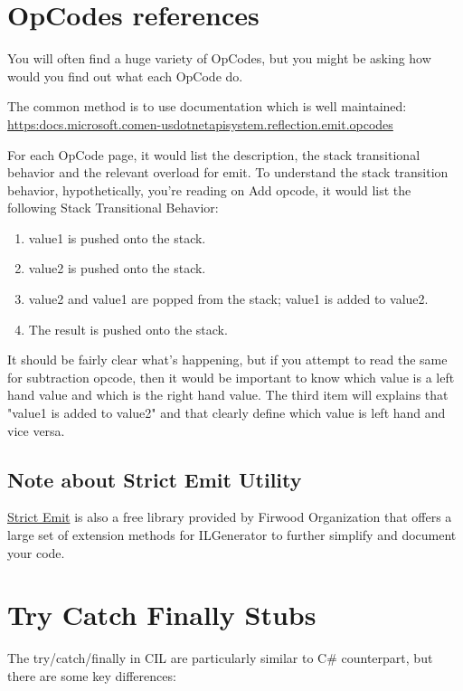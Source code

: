 \section{OpCodes references}
You will often find a huge variety of OpCodes, but you might be asking how would you find out what each OpCode do.

The common method is to use documentation which is well maintained: \href{https://docs.microsoft.com/en-us/dotnet/api/system.reflection.emit.opcodes}{https:\/\/docs.microsoft.com\/en-us\/dotnet\/api\/system.reflection.emit.opcodes}

 For each OpCode page, it would list the description, the stack transitional behavior and the relevant overload for emit. To understand the stack transition behavior, hypothetically, you're reading on Add opcode, it would list the following Stack Transitional Behavior:

\begin{enumerate}
\item value1 is pushed onto the stack. 
\item value2 is pushed onto the stack. 
\item value2 and value1 are popped from the stack; value1 is added to value2. 
\item The result is pushed onto the stack. 
\end{enumerate}

It should be fairly clear what's happening, but if you attempt to read the same for subtraction opcode, then it would be important to know which value is a left hand value and which is the right hand value. The third item will explains that "value1 is added to value2" and that clearly define which value is left hand and vice versa.

\subsection{Note about Strict Emit Utility}
\href{https://github.com/Firwood-Software/StrictEmit}{Strict Emit} is also a free library provided by Firwood Organization  that offers a large set of extension methods for ILGenerator to further simplify and document your code.

\newpage

\section{Try Catch Finally Stubs}
The try/catch/finally in CIL are particularly similar to C\# counterpart, but there are some key differences:

